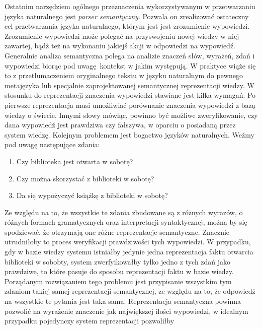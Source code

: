 \documentclass[a4paper, twoside, 12pt]{report}
\begin{document}
            Ostatnim narzędziem ogólnego przeznaczenia wykorzystywanym w przetwarzaniu języka naturalnego jest
            \emph{parser semantyczny}. Pozwala on zrealizować ostateczny cel przetwarzania języka naturalnego, którym
            jest jest zrozumienie wypowiedzi. Zrozumienie wypowiedzi może polegać na przyswojeniu nowej wiedzy w niej
            zawartej, bądź też na wykonaniu jakiejś akcji w odpowiedzi na wypowiedź. Generalnie analiza semantyczna
            polega na analizie znaczeń słów, wyrażeń, zdań i wypowiedzi biorąc pod uwagę kontekst w jakim występują.
            W praktyce wiąże się to z przetłumaczeniem oryginalnego tekstu w języku naturalnym do pewnego metajęzyka
            lub specjalnie zaprojektowanej semantycznej reprezentacji wiedzy. W stosunku do reprezentacji znaczenia
            wypowiedzi stawiane jest kilka wymagań. Po pierwsze reprezentacja musi umożliwiać porównanie znaczenia wypowiedzi
            z bazą wiedzy o świecie. Innymi słowy mówiąc, powinno być możliwe zweryfikowanie, czy dana wypowiedź jest
            prawdziwa czy fałszywa, w oparciu o posiadaną przez system wiedzę. Kolejnym problemem jest bogactwo języków
            naturalnych. Weźmy pod uwagę następujące zdania:
            \begin{enumerate}
                \item Czy biblioteka jest otwarta w sobotę?
                \item Czy można skorzystać z biblioteki w sobotę?
                \item Da się wypożyczyć książkę z biblioteki w sobotę?
            \end{enumerate}
            Ze względu na to, że wszystkie te zdania zbudowane są z różnych wyrazów, o różnych formach gramatycznych oraz
            interpretacji syntaktycznej, można by się spodziewać, że otrzymają one różne reprezentacje semantyczne. Znacznie
            utrudniłoby to proces weryfikacji prawdziwości tych wypowiedzi. W przypadku, gdy w bazie wiedzy systemu istniałby
            jedynie jedna reprezentacja faktu otwarcia biblioteki w sobobty, system zwerfyikowałby tylko jedno z tych zdań
            jako prawdziwe, to które pasuje do sposobu reprezentacji faktu w bazie wiedzy. Porządanym rozwiązaniem tego
            problemu jest przypisanie wszystkim tym zdaniom takiej samej reprezentacji semantycznej, ze względu na to, że
            odpowiedź na wszystkie te pytania jest taka sama. Reprezentacja semantyczna powinna pozwolić na wyrażenie
            znaczenie jak największej ilości wypowiedzi, w idealnym przypadku pojedynczy system reprezentacji pozwoliłby
\end{document}
